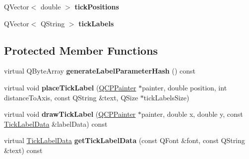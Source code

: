 \begin{DoxyCompactItemize}
\item 
Q\+Vector$<$ double $>$ {\bfseries tick\+Positions}\hypertarget{class_q_c_p_axis_painter_private_ae55e3dc2cf2af8d8a6e7235ccab54786}{}\label{class_q_c_p_axis_painter_private_ae55e3dc2cf2af8d8a6e7235ccab54786}

\item 
Q\+Vector$<$ Q\+String $>$ {\bfseries tick\+Labels}\hypertarget{class_q_c_p_axis_painter_private_ad0a4998ca358ba751e84fca45a025abd}{}\label{class_q_c_p_axis_painter_private_ad0a4998ca358ba751e84fca45a025abd}

\end{DoxyCompactItemize}
\subsection*{Protected Member Functions}
\begin{DoxyCompactItemize}
\item 
virtual Q\+Byte\+Array {\bfseries generate\+Label\+Parameter\+Hash} () const \hypertarget{class_q_c_p_axis_painter_private_a91a023bbefe1c3bf330570c0b985de84}{}\label{class_q_c_p_axis_painter_private_a91a023bbefe1c3bf330570c0b985de84}

\item 
virtual void {\bfseries place\+Tick\+Label} (\hyperlink{class_q_c_p_painter}{Q\+C\+P\+Painter} $\ast$painter, double position, int distance\+To\+Axis, const Q\+String \&text, Q\+Size $\ast$tick\+Labels\+Size)\hypertarget{class_q_c_p_axis_painter_private_af8fe7350c19575bc33ca770f9b3a15fd}{}\label{class_q_c_p_axis_painter_private_af8fe7350c19575bc33ca770f9b3a15fd}

\item 
virtual void {\bfseries draw\+Tick\+Label} (\hyperlink{class_q_c_p_painter}{Q\+C\+P\+Painter} $\ast$painter, double x, double y, const \hyperlink{struct_q_c_p_axis_painter_private_1_1_tick_label_data}{Tick\+Label\+Data} \&label\+Data) const \hypertarget{class_q_c_p_axis_painter_private_ad8f2f12cd35b8189e8bf96679e873933}{}\label{class_q_c_p_axis_painter_private_ad8f2f12cd35b8189e8bf96679e873933}

\item 
virtual \hyperlink{struct_q_c_p_axis_painter_private_1_1_tick_label_data}{Tick\+Label\+Data} {\bfseries get\+Tick\+Label\+Data} (const Q\+Font \&font, const Q\+String \&text) const \hypertarget{class_q_c_p_axis_painter_private_ad9f24fbcbf9d8c92b34d9d00b010e6a3}{}\label{class_q_c_p_axis_painter_private_ad9f24fbcbf9d8c92b34d9d00b010e6a3}


\end{DoxyCompactItemize}
